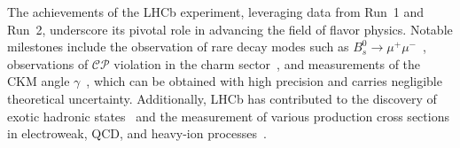 The achievements of the LHCb experiment, leveraging data from Run~1 and Run~2, underscore its pivotal role in advancing the field of flavor physics. Notable milestones include the observation of rare decay modes such as $B^0_s\rightarrow\mu^+\mu^-$~\cite{PhysRevLett.111.101805}, observations of $\mathcal{CP}$ violation in the charm sector~\cite{Maccolini:2022y6}, and measurements of the CKM angle $\gamma$~\cite{Aaij_2016}, which can be obtained with high precision and carries negligible theoretical uncertainty. Additionally, LHCb has contributed to the discovery of exotic hadronic states~\cite{FANG202266, PhysRevLett.115.072001} and the measurement of various production cross sections in electroweak, QCD, and heavy-ion processes~\cite{ZBoson, Raab:2815873, Duan:2826531}.






